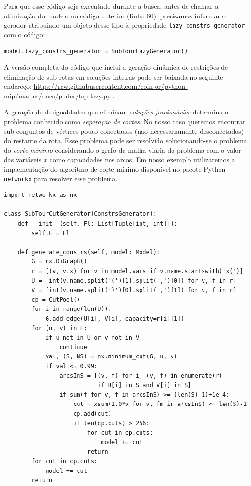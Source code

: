 \documentclass[a4paper,11pt,fleqn]{article}
\begin{document}
Para que esse código seja executado durante a busca, antes de chamar a otimização do modelo no código anterior (linha 60), precisamos informar o gerador atribuindo um objeto desse tipo à propriedade \texttt{lazy\_constrs\_generator} com o código: 

\begin{center}
\texttt{model.lazy\_constrs\_generator = SubTourLazyGenerator()}
\end{center}

A versão completa do código que inclui a geração dinâmica de restrições de eliminação de sub-rotas em soluções inteiras pode ser baixada no seguinte endereço: \url{https://raw.githubusercontent.com/coin-or/python-mip/master/docs/podes/tsp-lazy.py} .

A geração de desigualdades que eliminam \emph{soluções fracionárias} determina o problema conhecido como \emph{separação de cortes}. No nosso caso queremos encontrar sub-conjuntos de vértices pouco conectados (não necessariamente desconectados) do restante da rota. Esse problema pode ser resolvido solucionando-se o problema do \emph{corte mínimo} considerando o grafo da malha viária do problema com o valor das variáveis $x$ como capacidades nos arcos. Em nosso exemplo utilizaremos a implementação do algoritmo de corte mínimo disponível no pacote Python \texttt{networkx} para resolver esse problema.

{\small
\begin{lstlisting}
import networkx as nx

class SubTourCutGenerator(ConstrsGenerator):
    def __init__(self, Fl: List[Tuple[int, int]]):
        self.F = Fl

    def generate_constrs(self, model: Model):
        G = nx.DiGraph()
        r = [(v, v.x) for v in model.vars if v.name.startswith('x(')]
        U = [int(v.name.split('(')[1].split(',')[0]) for v, f in r]
        V = [int(v.name.split(')')[0].split(',')[1]) for v, f in r]
        cp = CutPool()
        for i in range(len(U)):
            G.add_edge(U[i], V[i], capacity=r[i][1])
        for (u, v) in F:
            if u not in U or v not in V:
                continue
            val, (S, NS) = nx.minimum_cut(G, u, v)
            if val <= 0.99:
                arcsInS = [(v, f) for i, (v, f) in enumerate(r)
                           if U[i] in S and V[i] in S]
                if sum(f for v, f in arcsInS) >= (len(S)-1)+1e-4:
                    cut = xsum(1.0*v for v, fm in arcsInS) <= len(S)-1
                    cp.add(cut)
                    if len(cp.cuts) > 256:
                        for cut in cp.cuts:
                            model += cut
                        return
        for cut in cp.cuts:
            model += cut
        return
\end{lstlisting}}
\end{document}
